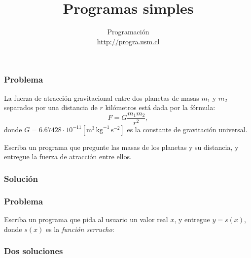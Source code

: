 \documentclass[12pt]{beamer}
\title{Programas simples}
\author{Programación \\ \url{http://progra.usm.cl}}
\date{}
\begin{document}
  \begin{frame}
    \maketitle
  \end{frame}

  \begin{frame}
    \label{problema-gravitacion}
    \frametitle{Problema}
    La fuerza de atracción gravitacional
    entre dos planetas de masas \(m_1\) y \(m_2\)
    separados por una distancia de \(r\) kilómetros
    está dada por la fórmula:
    \[ F = G\frac{m_1 m_2}{r^2}, \]
    donde
    \(G = 6.67428\cdot 10^{-11} [\text{m}^3\,\text{kg}^{-1}\,\text{s}^{-2}]\)
    es la constante de gravitación universal.

    Escriba un programa que pregunte las masas de los planetas y su distancia,
    y entregue la fuerza de atracción entre ellos.
  \end{frame}

  \begin{frame}
    \label{gravitacion}
    \frametitle{Solución}
    
  \end{frame}

  \begin{frame}
    \label{problema-serrucho}
    \frametitle{Problema}
    Escriba un programa que pida al usuario un valor real \(x\),
    y entregue \(y = s(x)\),
    donde \(s(x)\) es la \emph{función serrucho}:

    \begin{center}
    \end{center}

    
  \end{frame}

  \begin{frame}
    \label{serrucho}
    \frametitle{Dos soluciones}
    
  \end{frame}
\end{document}
